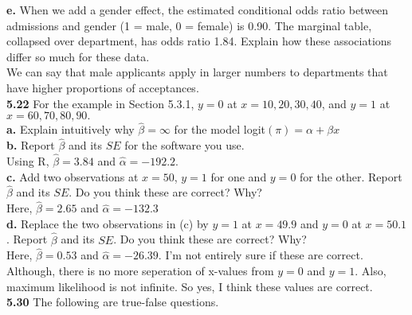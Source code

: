\documentclass[paper=letter, fontsize=11pt]{scrartcl} %
\begin{document}
\textbf{e.} When we add a gender effect, the estimated conditional odds ratio between
admissions and gender (1 = male, 0 = female) is 0.90. The marginal table, collapsed
over department, has odds ratio 1.84. Explain how these associations differ so much
for these data.
\\

We can say that male applicants apply in larger numbers to departments that have higher
proportions of acceptances.
\\

\textbf{5.22} For the example in Section 5.3.1, $y = 0$ at $x = 10,20,30,40$, and $y=1$
at $x = 60,70,80,90.$ \\

\textbf{a.} Explain intuitively why $\hat{\beta} = \infty$ for the model
logit$(\pi) = \alpha + \beta x$ 
\\

\textbf{b.} Report $\hat{\beta}$ and its $SE$ for the software you use.
\\

Using R, $\hat{\beta} = 3.84$ and $\hat{\alpha} = -192.2$.
\\

\textbf{c.} Add two observations at $x = 50$, $y = 1$ for one and $y = 0$ for the other.
Report $\hat{\beta}$ and its $SE$. Do you think these are correct? Why?
\\

Here, $\hat{\beta} = 2.65$ and $\hat{\alpha} = -132.3$
\\

\textbf{d.} Replace the two observations in (c) by $y = 1$ at $x = 49.9$ and $y = 0$ at
$x = 50.1$. Report $\hat{\beta}$ and its $SE$. Do you think these are correct? Why?
\\

Here, $\hat{\beta} = 0.53$ and $\hat{\alpha} = -26.39$. I'm not entirely sure if these
are correct. Although, there is no more seperation of x-values from $y=0$ and $y=1$.
Also, maximum likelihood is not infinite. So yes, I think these values are correct.
\\

\textbf{5.30} The following are true-false questions. \\
\end{document}
